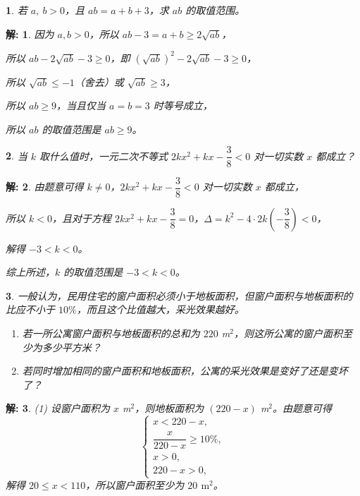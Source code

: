 \documentclass[aspectratio=169,13pt,fleqn,t] {beamer}
\newtheorem*{solve}{解:}
\newtheorem{Prob}{}
\begin{document}
\begin{frame}
	\begin{Prob}
	若 $a,\ b>0$，且 $ab=a+b+3$，求 $ab$ 的取值范围。
	\end{Prob}
	
	\begin{solve}
		因为 $a,b>0$，所以 $ab-3=a+b\geq 2\sqrt{ab}$，
		
		所以 $ab-2\sqrt{ab}-3\geq 0$，即 \;$(\sqrt{ab})^2 - 2\sqrt{ab}- 3 \geq 0$，
		
		所以 $\sqrt{ab}\leq -1$（舍去）或 $\sqrt{ab}\geq 3$，
		
		所以 $ab\geq 9$，当且仅当 $a=b=3$ 时等号成立，
		
		所以 $ab$ 的取值范围是 $ab\geq 9$。
		
	\end{solve}
\end{frame}

\begin{frame}
	\begin{Prob}
		当 $k$ 取什么值时，一元二次不等式 $2kx^2+kx-\dfrac{3}{8}<0$ 对一切实数 $x$ 都成立？
	\end{Prob}
	
	\begin{solve}
		由题意可得 $k\neq 0$，$2kx^2+kx-\dfrac{3}{8}<0$ 对一切实数 $x$ 都成立，
		
		所以 $k<0$，且对于方程 $2kx^2+kx-\dfrac{3}{8}=0$，$\Delta=k^2-4\cdot 2k\left(-\dfrac{3}{8}\right)<0$，
		
		解得 $-3<k<0$。
		
		综上所述，$k$ 的取值范围是 $-3<k<0$。
		
	\end{solve}
\end{frame}

\begin{frame}
	\vspace{-1em}
	\begin{Prob}\small
	一般认为，民用住宅的窗户面积必须小于地板面积，但窗户面积与地板面积的比应不小于 $10\%$，而且这个比值越大，采光效果越好。	
	\begin{enumerate}[(1)]
		\item 若一所公寓窗户面积与地板面积的总和为 $220$ m$^2$，则这所公寓的窗户面积至少为多少平方米？
		\item 若同时增加相同的窗户面积和地板面积，公寓的采光效果是变好了还是变坏了？
	\end{enumerate}
	\end{Prob}
	\vspace{-1em}
	\begin{solve}

				(1) 设窗户面积为 $x$ m$^2$，则地板面积为 $(220-x)$ m$^2$。由题意可得
				\[
				\begin{cases}
					x<220-x,\\
					\dfrac{x}{220-x}\geq 10\%,\\
					x>0,\\
					220-x>0,
				\end{cases}
				\]
				解得 $20\leq x<110$，所以窗户面积至少为 $20$ $ \mathrm{m^2}$。	
\end{solve}
\end{frame}
	
\end{document}
